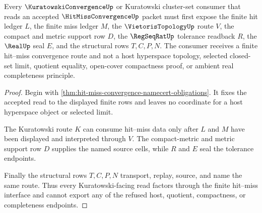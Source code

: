 \begin{theorem}
\label{thm:hit-miss-convergence-kuratowski-route}
Every $\KuratowskiConvergenceUp$ or Kuratowski cluster-set consumer that reads an accepted $\HitMissConvergenceUp$ packet must first expose the finite hit ledger $L$, the finite miss ledger $M$, the $\VietorisTopologyUp$ route $V$, the compact and metric support row $D$, the $\RegSeqRatUp$ tolerance readback $R$, the $\RealUp$ seal $E$, and the structural rows $T,C,P,N$. The consumer receives a finite hit--miss convergence route and not a host hyperspace topology, selected closed-set limit, quotient equality, open-cover compactness proof, or ambient real completeness principle.
\end{theorem}
\begin{proof}
Begin with \autoref{thm:hit-miss-convergence-namecert-obligations}. It fixes the accepted read to the displayed finite rows and leaves no coordinate for a host hyperspace object or selected limit.

The Kuratowski route $K$ can consume hit--miss data only after $L$ and $M$ have been displayed and interpreted through $V$. The compact-metric and metric support row $D$ supplies the named source cells, while $R$ and $E$ seal the tolerance endpoints.

Finally the structural rows $T,C,P,N$ transport, replay, source, and name the same route. Thus every Kuratowski-facing read factors through the finite hit--miss interface and cannot export any of the refused host, quotient, compactness, or completeness endpoints.
\end{proof}





